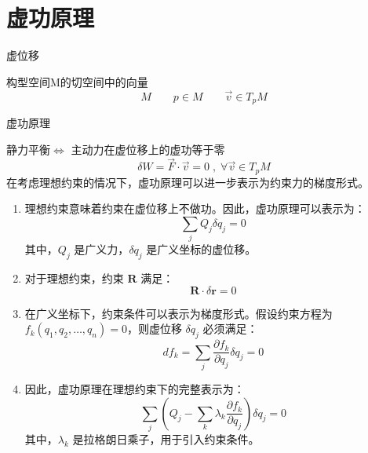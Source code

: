 \documentclass[12pt, a4paper, oneside, UTF8]{ctexbook}  %
\begin{document}
\section{虚功原理}
\begin{defn}\label{virtualdisplacement}
    虚位移

    构型空间M的切空间中的向量
    \[ M \qquad p \in M \qquad \vec{v} \in T_{p}M \]
\end{defn}
\begin{principle}
    虚功原理

    静力平衡$\Leftrightarrow$ 主动力在虚位移上的虚功等于零
    \[
    \delta W=\vec{F}\cdot\vec{v}=0\;,\;\forall\vec{v}\in T_p M
    \]
    在考虑理想约束的情况下，虚功原理可以进一步表示为约束力的梯度形式。
\begin{enumerate}
    \item 理想约束意味着约束在虚位移上不做功。因此，虚功原理可以表示为：
    \[
    \sum_{j} Q_j \delta q_j = 0
    \]
    其中，\( Q_j \) 是广义力，\( \delta q_j \) 是广义坐标的虚位移。
    \item 对于理想约束，约束 \( \mathbf{R} \) 满足：
    \[
    \mathbf{R} \cdot \delta \mathbf{r} = 0
    \]
    \item 在广义坐标下，约束条件可以表示为梯度形式。假设约束方程为 \( f_k(q_1, q_2, \dots, q_n) = 0 \)，则虚位移 \( \delta q_j \) 必须满足：
    \[
    d f_k =\sum_{j} \frac{\partial f_k}{\partial q_j} \delta q_j = 0
    \]
    \item 因此，虚功原理在理想约束下的完整表示为：
    \[
    \sum_{j} \left( Q_j - \sum_{k} \lambda_k \frac{\partial f_k}{\partial q_j} \right) \delta q_j = 0
    \]
    其中，\( \lambda_k \) 是拉格朗日乘子，用于引入约束条件。
\end{enumerate}
\end{principle}
\end{document}

